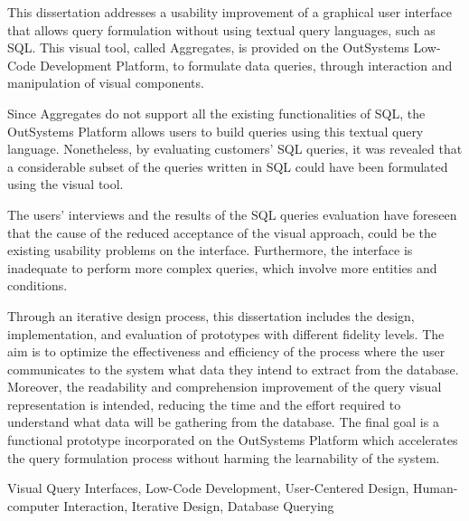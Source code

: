 This dissertation addresses a usability improvement of a graphical user interface that allows query formulation without using textual query languages, such as SQL. This visual tool, called Aggregates, is provided on the OutSystems Low-Code Development Platform, to formulate data queries, through interaction and manipulation of visual components. 

Since Aggregates do not support all the existing functionalities of SQL, the OutSystems Platform allows users to build queries using this textual query language. Nonetheless, by evaluating customers' SQL queries, it was revealed that a considerable subset of the queries written in SQL could have been formulated using the visual tool.

The users' interviews and the results of the SQL queries evaluation have foreseen that the cause of the reduced acceptance of the visual approach, could be the existing usability problems on the interface. Furthermore, the interface is inadequate to perform more complex queries, which involve more entities and conditions.

Through an iterative design process, this dissertation includes the design, implementation, and evaluation of prototypes with different fidelity levels. The aim is to optimize the effectiveness and efficiency of the process where the user communicates to the system what data they intend to extract from the database. Moreover, the readability and comprehension improvement of the query visual representation is intended, reducing the time and the effort required to understand what data will be gathering from the database. The final goal is a functional prototype incorporated on the OutSystems Platform which accelerates the query formulation process without harming the learnability of the system.


\begin{keywords}
Visual Query Interfaces, Low-Code Development, User-Centered Design, Human-computer Interaction, Iterative Design, Database Querying
\end{keywords} 
